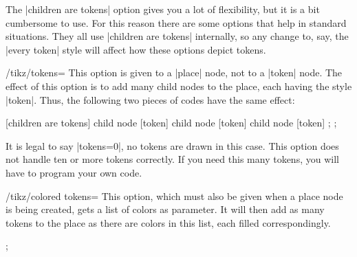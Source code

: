 The |children are tokens| option gives you a lot of flexibility, but it is a
bit cumbersome to use. For this reason there are some options that help in
standard situations. They all use |children are tokens| internally, so any
change to, say, the |every token| style will affect how these options depict
tokens.

\begin{key}{/tikz/tokens=}
    This option is given to a |place| node, not to a |token| node. The effect
    of this option is to add  many child nodes to the place, each
    having the style |token|. Thus, the following two pieces of codes have the
    same effect:
\begin{codeexample}[preamble={\usetikzlibrary{petri}}]
\tikz
  \node[place] {}
  [children are tokens]
  child {node [token] {}}
  child {node [token] {}}
  child {node [token] {}};
\tikz
  \node[place,tokens=3] {};
\end{codeexample}
    It is legal to say |tokens=0|, no tokens are drawn in this case. This
    option does not handle ten or more tokens correctly. If you need this many
    tokens, you will have to program your own code.
\begin{codeexample}[preamble={\usetikzlibrary{petri}}]
\end{codeexample}
\end{key}

\begin{key}{/tikz/colored tokens=}
    This option, which must also be given when a place node is being created,
    gets a list of colors as parameter. It will then add as many tokens to the
    place as there are colors in this list, each filled correspondingly.
\begin{codeexample}[preamble={\usetikzlibrary{petri}}]
\tikz  \node[place,colored tokens={black,black,red,blue}] {};
\end{codeexample}
\end{key}

